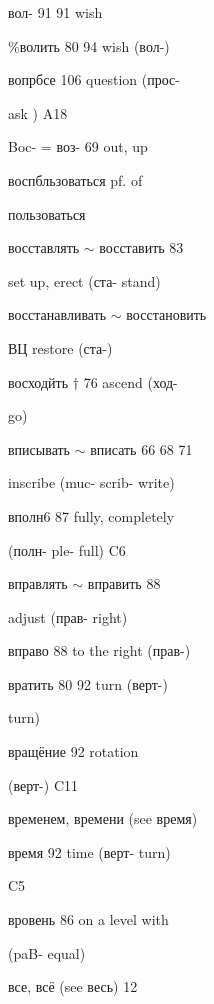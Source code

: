 \clearpage
\thispagestyle{plain}
\begingroup
\cyrillicfont
\fontsize{7.25}{8.25}\selectfont
\setlength{\parindent}{0pt}
\setlength{\parskip}{0pt}
\setlength{\emergencystretch}{1.5em}
\noindent
\begin{minipage}[t]{0.475\textwidth}
\raggedright
\noindent вол- 91 91 wish\par
\noindent \%волить 80 94 wish (вол-)\par
\noindent вопрбсе 106 question (прос-\par
\noindent ask ) A18\par
\noindent Boc- = воз- 69 out, up\par
\noindent воспбльзоваться pf. of\par
\noindent пользоваться\par
\noindent восставлять $\sim$ восставить 83\par
\noindent set up, erect (ста- stand)\par
\noindent восстанавливать $\sim$ восстановить\par
\noindent ВЦ restore (ста-)\par
\noindent восходйть $\dagger$ 76 ascend (ход-\par
\noindent go)\par
\noindent вписывать $\sim$ вписать 66 68 71\par
\noindent inscribe (muc-  scrib- write)\par
\noindent вполн6 87 fully, completely\par
\noindent (полн- ple- full) C6\par
\noindent вправлять $\sim$ вправить 88\par
\noindent adjust (прав- right)\par
\noindent вправо 88 to the right (прав-)\par
\noindent *вратить 80 92 turn (верт-)\par
\noindent turn)\par
\noindent вращёние 92 rotation\par
\noindent (верт-) C11\par
\noindent временем, времени (see время)\par
\noindent время 92 time (верт- turn)\par
\noindent C5\par
\noindent вровень 86 on a level with\par
\noindent (paB- equal)\par
\noindent все, всё (see весь) 12\par

\end{minipage}
